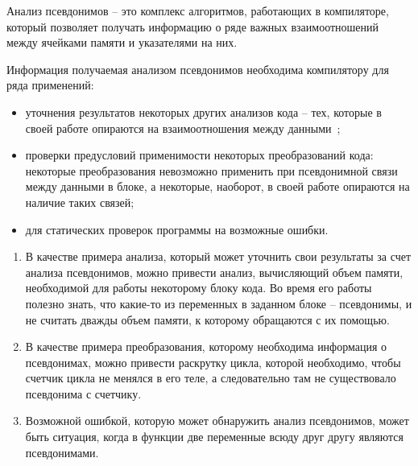 





\Intro


\begin{mydefinition}
Анализ псевдонимов -- это комплекс алгоритмов, работающих в компиляторе, который позволяет получать информацию о ряде важных взаимоотношений между ячейками памяти и указателями на них.
\end{mydefinition}

Информация получаемая анализом псевдонимов необходима компилятору для ряда применений:
\begin{itemize}
\item уточнения результатов некоторых других анализов кода -- тех, которые в своей работе опираются на взаимоотношения между данными~\autocite{Voevodin};
\item проверки предусловий применимости некоторых преобразований кода: некоторые преобразования невозможно применить при псевдонимной связи между данными в блоке, а некоторые, наоборот, в своей работе опираются на наличие таких связей;
\item для статических проверок программы на возможные ошибки.
\end{itemize}

\begin{myexamples}
\begin{enumerate}
\item В качестве примера анализа, который может уточнить свои результаты за счет анализа псевдонимов, можно привести анализ, вычисляющий объем памяти, необходимой для работы некоторому блоку кода. Во время его работы полезно знать, что какие-то из переменных в заданном блоке -- псевдонимы, и не считать дважды объем памяти, к которому обращаются с их помощью.
\item В качестве примера преобразования, которому необходима информация о псевдонимах, можно привести раскрутку цикла, которой необходимо, чтобы счетчик цикла не менялся в его теле, а следовательно там не существовало псевдонима с счетчику.
\item Возможной ошибкой, которую может обнаружить анализ псевдонимов, может быть ситуация, когда в функции две переменные всюду друг другу являются псевдонимами.
\end{enumerate}
\end{myexamples}

